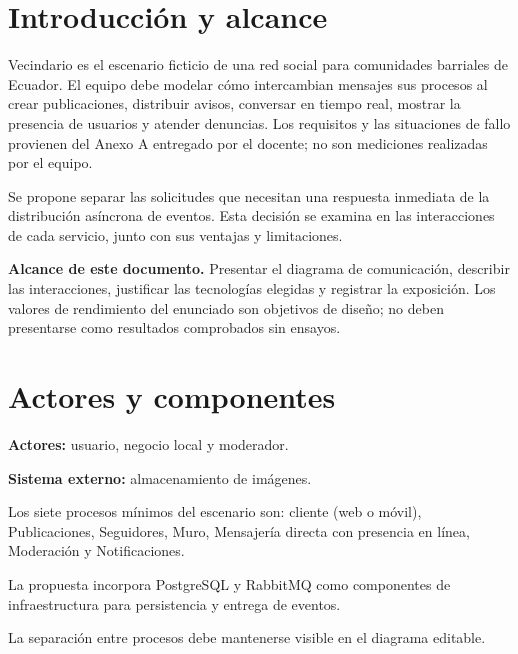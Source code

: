 \documentclass[12pt,a4paper]{article}
\begin{document}
\hypersetup{pageanchor=true}

\tableofcontents
\newpage


\section{Introducción y alcance}

Vecindario es el escenario ficticio de una red social para comunidades barriales de Ecuador. El equipo debe modelar cómo intercambian mensajes sus procesos al crear publicaciones, distribuir avisos, conversar en tiempo real, mostrar la presencia de usuarios y atender denuncias. Los requisitos y las situaciones de fallo provienen del Anexo A entregado por el docente; no son mediciones realizadas por el equipo.

Se propone separar las solicitudes que necesitan una respuesta inmediata de la distribución asíncrona de eventos. Esta decisión se examina en las interacciones de cada servicio, junto con sus ventajas y limitaciones.

\textbf{Alcance de este documento.} Presentar el diagrama de comunicación, describir las interacciones, justificar las tecnologías elegidas y registrar la exposición. Los valores de rendimiento del enunciado son objetivos de diseño; no deben presentarse como resultados comprobados sin ensayos.


\section{Actores y componentes}

\textbf{Actores:} usuario, negocio local y moderador.

\textbf{Sistema externo:} almacenamiento de imágenes.

Los siete procesos mínimos del escenario son: cliente (web o móvil), Publicaciones, Seguidores, Muro, Mensajería directa con presencia en línea, Moderación y Notificaciones.

La propuesta incorpora PostgreSQL y RabbitMQ como componentes de infraestructura para persistencia y entrega de eventos.

La separación entre procesos debe mantenerse visible en el diagrama editable.
\end{document}
